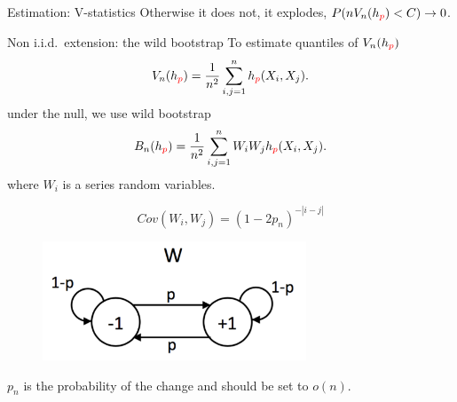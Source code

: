 \begin{frame}
\begin{columns}
\begin{column}{.33\linewidth}
\begin{block}{Estimation: V-statistics}
Otherwise it does not,  it explodes, $P(n V_n(h_{\color{red} p}) <C) \to 0$.
\end{block}
\vspace{-0.75cm}
\begin{block}{Non i.i.d.\ extension: the wild bootstrap}
To estimate quantiles of $ V_n(h_{\color{red} p})$  
\[
 V_n(h_{\color{red} p}) = \frac {1} {n^2} \sum_{i,j=1}^n h_{\color{red} p}(X_i,X_j).
\]
under the null, we use wild bootstrap
\[
 B_n(h_{\color{red} p}) = \frac {1} {n^2} \sum_{i,j=1}^n W_i W_j h_{\color{red} p}(X_i,X_j).
\]
  where $W_i$ is a  series  random variables.
\begin{center}
  \begin{minipage}{.49\linewidth}
       $$
  Cov(W_i,W_j) = (1-2p_n)^{-|i-j|}
  $$
\end{minipage}
\begin{minipage}{.49\linewidth}
 \begin{figure}
            \vspace{-0.5cm}
           \includegraphics[width=0.7\textwidth, angle =0 ]{../../presentation/img/W_graphicalModel.pdf} 
        \end{figure}
\end{minipage}
\end{center}
  $p_n$ is  the probability of the change  and should be set to $o(n)$.



\end{block}
\end{column}
\end{columns}
\end{frame}
